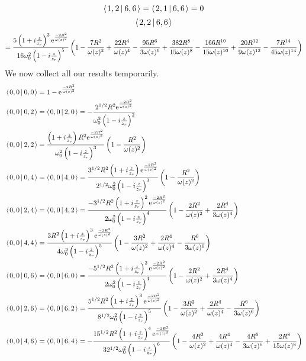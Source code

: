 \documentclass[11pt]{amsart}
\makeatletter
\newcommand{\e}{{\rm e}}				%
\newcommand{\msp}[1]{\mspace{#1mu}}		%
\newcommand{\0}{\varnothing}		%
\newcommand{\brac}[2]{\left\langle\msp{2} #1\left\lvert \msp{3.5} #2 \right.\right\rangle}	%
\newcommand{\1}{!}
\newcommand{\2}{@}
\newcommand{\3}{\#}
\newcommand{\4}{\$}
\newcommand{\5}{\%}
\newcommand{\6}{$^\wedge$}
\newcommand{\7}{\&}
\newcommand{\8}{*}
\newcommand{\9}{(}
\makeatother
\begin{document}
\[
\brac{1,2}{6,6} = \brac{2,1}{6,6} = 0
\]
\[
\brac{2,2}{6,6}
\]
\[ = \frac{5\left(1+i\frac{z}{z_r}\right)^3\e^{\frac{-2R^2}{\omega(z)^2}}}{16\omega_0^2\left(1-i\frac{z}{z_r}\right)^5}\left(1-\frac{7R^2}{\omega(z)^2}+\frac{22R^4}{\omega(z)^4}-\frac{95R^6}{3\omega(z)^6}+\frac{382R^8}{15\omega(z)^8}-\frac{166R^{10}}{15\omega(z)^{10}}+\frac{20R^{12}}{9\omega(z)^{12}}-\frac{7R^{14}}{45\omega(z)^{14}}\right)
\]
\newpage
We now collect all our results temporarily.
\begin{align*}
&\brac{0,0}{0,0} = 1-\e^{\frac{-2R^2}{\omega(z)^2}}
\\
&\brac{0,0}{0,2} = \brac{0,0}{2,0} = -\frac{2^{1/2}R^2\e^{\frac{-2R^2}{\omega(z)^2}}}{\omega_0^2\left(1-i\frac{z}{z_r}\right)^2}
\\
&\brac{0,0}{2,2} = \frac{\left(1+i\frac{z}{z_r}\right)R^2\e^{\frac{-2R^2}{\omega(z)^2}}}{\omega_0^2\left(1-i\frac{z}{z_r}\right)^3}\left(1-\frac{R^2}{\omega(z)^2}\right)
\\
&\brac{0,0}{0,4} = \brac{0,0}{4,0} = \frac{3^{1/2}R^2\left(1+i\frac{z}{z_r}\right)\e^{\frac{-2R^2}{\omega(z)^2}}}{2^{1/2}\omega_0^2\left(1-i\frac{z}{z_r}\right)^3}\left(1-\frac{R^2}{\omega(z)^2}\right)
\\
&\brac{0,0}{2,4} = \brac{0,0}{4,2} = \frac{-3^{1/2}R^2\left(1+i\frac{z}{z_r}\right)^2\e^{\frac{-2R^2}{\omega(z)^2}}}{2\omega_0^2\left(1-i\frac{z}{z_r}\right)^4}\left(1-\frac{2R^2}{\omega(z)^2}+\frac{2R^4}{3\omega(z)^4}\right)
\\
&
\brac{0,0}{4,4} = \frac{3R^2\left(1+i\frac{z}{z_r}\right)^3\e^{\frac{-2R^2}{\omega(z)^2}}}{4\omega_0^2\left(1-i\frac{z}{z_r}\right)^5}\left(1-\frac{3R^2}{\omega(z)^2}+\frac{2R^4}{\omega(z)^4}-\frac{R^6}{3\omega(z)^6}\right)
\\
&
\brac{0,0}{0,6} = \brac{0,0}{6,0} =   \frac{-5^{1/2}R^2\left(1+i\frac{z}{z_r}\right)^2\e^{\frac{-2R^2}{\omega(z)^2}}}{2\omega_0^2\left(1-i\frac{z}{z_r}\right)^4}\left(1-\frac{2R^2}{\omega(z)^2}+\frac{2R^4}{3\omega(z)^4}\right) 
\\
&
\brac{0,0}{2,6} = \brac{0,0}{6,2} = \frac{5^{1/2}R^2\left(1+i\frac{z}{z_r}\right)^3\e^{\frac{-2R^2}{\omega(z)^2}}}{8^{1/2}\omega_0^2\left(1-i\frac{z}{z_r}\right)^5}\left(1-\frac{3R^2}{\omega(z)^2}+\frac{2R^4}{\omega(z)^4}-\frac{R^6}{3\omega(z)^6}\right)
\\
&
\brac{0,0}{4,6} = \brac{0,0}{6,4} =-\frac{15^{1/2}R^2\left(1+i\frac{z}{z_r}\right)^4\e^{\frac{-2R^2}{\omega(z)^2}}}{32^{1/2}\omega_0^2\left(1-i\frac{z}{z_r}\right)^6}\left(1-\frac{4R^2}{\omega(z)^2}+\frac{4R^4}{\omega(z)^4}-\frac{4R^6}{3\omega(z)^6}+\frac{2R^8}{15\omega(z)^8}\right)

\end{align*}
\end{document}
